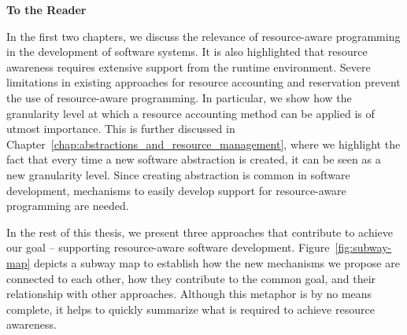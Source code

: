 \thispagestyle{plain}
\noindent\makebox[\linewidth]{\rule{\textwidth}{2pt}}

\vspace{0.5cm}
{\Huge \textbf{To the Reader}}
\vspace{0.2cm}

\noindent\makebox[\linewidth]{\rule{\textwidth}{2pt}}

\newcommand{\placelast}{west}
\newcommand{\placelastt}{south}
\newcommand{\placelasttt}{north}

In the first two chapters, we discuss the relevance of resource-aware programming in the development of software systems.
It is also highlighted that resource awareness requires extensive support from the runtime environment.
Severe limitations in existing approaches for resource accounting and reservation prevent the use of resource-aware programming.
In particular, we show how the granularity level at which a resource accounting method can be applied is of utmost importance. %
This is further discussed in Chapter~\ref{chap:abstractions_and_resource_management}, where we highlight the fact that every time a new software abstraction is created, it can be seen as a new granularity level.
Since creating abstraction is common in software development, mechanisms to easily develop support for resource-aware programming are needed. 

In the rest of this thesis, we present three approaches that contribute to achieve our goal -- supporting resource-aware software development.
Figure~\ref{fig:subway-map} depicts a subway map to establish how the new mechanisms we propose are connected to each other, how they contribute to the common goal, and their relationship with other approaches.
Although this metaphor is by no means complete, it helps to quickly summarize what is required to achieve resource awareness. 

